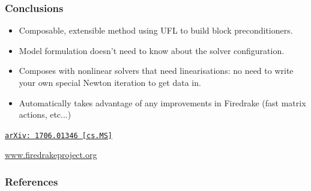 \documentclass[presentation,aspectratio=43]{beamer}
\newcommand{\arxivlink}[2]{%
  \href{http://www.arxiv.org/abs/#1}%
  {{\small\texttt{arXiv:\,#1\,[#2]}}}%
}
\begin{document}
\begin{frame}
  \frametitle{Conclusions}

  \begin{itemize}
  \item Composable, extensible method using UFL to build block
    preconditioners.

  \item Model formulation doesn't need to know about the solver
    configuration.

  \item Composes with nonlinear solvers that need linearisations: no
    need to write your own special Newton iteration to get data in.

  \item Automatically takes advantage of any improvements in Firedrake
    (fast matrix actions, etc...)

  \end{itemize}

  \begin{center}
    \textcite{Kirby:2018} \arxivlink{1706.01346}{cs.MS}

    \url{www.firedrakeproject.org}
  \end{center}
\end{frame}


\appendix
\begin{frame}
  \frametitle{References}
  \printbibliography[heading=none]
\end{frame}
\egroup
\end{document}
